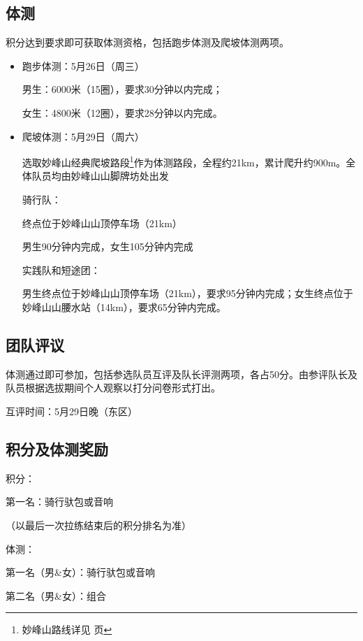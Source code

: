 \documentclass{ctexbook}
\begin{document}
\subsection{体测}

积分达到要求即可获取体测资格，包括跑步体测及爬坡体测两项。
\begin{itemize}

\item 跑步体测：5月26日（周三）

男生：6000米（15圈），要求30分钟以内完成；

女生：4800米（12圈），要求28分钟以内完成。

\item 爬坡体测：5月29日（周六）

选取妙峰山经典爬坡路段\footnote{妙峰山路线详见 \pageref{subsec:妙峰山} 页}作为体测路段，全程约21km，累计爬升约900m。全体队员均由妙峰山山脚牌坊处出发

骑行队：

终点位于妙峰山山顶停车场（21km）

男生90分钟内完成，女生105分钟内完成

实践队和短途团：

男生终点位于妙峰山山顶停车场（21km），要求95分钟内完成；女生终点位于妙峰山山腰水站（14km），要求65分钟内完成。

\end{itemize}

\subsection{团队评议}

体测通过即可参加，包括参选队员互评及队长评测两项，各占50分。由参评队长及队员根据选拔期间个人观察以打分问卷形式打出。

互评时间：5月29日晚（东区）
\subsection{积分及体测奖励}

积分：

 第一名：骑行驮包或音响

（以最后一次拉练结束后的积分排名为准）



体测：

第一名（男\&女）：骑行驮包或音响

第二名（男\&女）：组合
\end{document}

